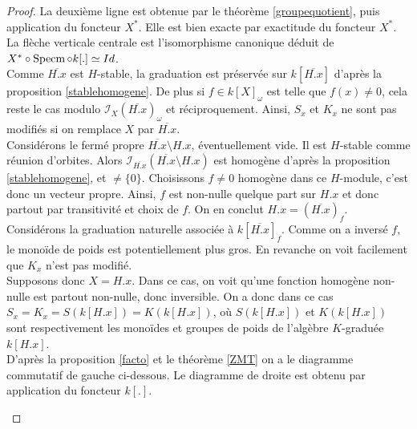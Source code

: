 \begin{proof}
La deuxième ligne est obtenue par le théorème \ref{groupequotient}, puis application du foncteur $X^*$. Elle est bien exacte par exactitude du foncteur $X^*$. La flèche verticale centrale est l'isomorphisme canonique déduit de $X^*\circ\operatorname{Specm}\circ k[.]\simeq Id$.\\ 
Comme $\overline{H.x}$ est $H$-stable, la graduation est préservée sur $k[\overline{H.x}]$ d'après la proposition \ref{stablehomogene}. De plus si $f\in k[X]_{\omega}$ est telle que $f(x)\neq 0$, cela reste le cas modulo $\mathcal{I}_{X}(\overline{H.x})_\omega$ et réciproquement. Ainsi, $S_x$ et $K_x$ ne sont pas modifiés si on remplace $X$ par $\overline{H.x}$. \\
Considérons le fermé propre $\overline{H.x}\setminus H.x$, éventuellement vide. Il est $H$-stable comme réunion d'orbites. Alors $\mathcal{I}_{\overline{H.x}}(\overline{H.x}\setminus H.x)$ est homogène d'après la proposition \ref{stablehomogene}, et $\neq \lbrace 0\rbrace$. Choisissons $f\neq0$ homogène dans ce $H$-module, c'est donc un vecteur propre. Ainsi, $f$ est non-nulle quelque part sur $H.x$ et donc partout par transitivité et choix de $f$. On en conclut $H.x=(\overline{H.x})_f$. Considérons la graduation naturelle associée à $k[\overline{H.x}]_f$. Comme on a inversé $f$, le monoïde de poids est potentiellement plus gros. En revanche on voit facilement que $K_x$ n'est pas modifié.\\
Supposons donc $X=H.x$. Dans ce cas, on voit qu'une fonction homogène non-nulle est partout non-nulle, donc inversible. On a donc dans ce cas $S_x=K_x=S(k[H.x])=K(k[H.x])$, où $S(k[H.x])$ et $K(k[H.x])$ sont respectivement les monoïdes et groupes de poids de l'algèbre $K$-graduée $k[H.x]$. \\
D'après la proposition \ref{facto} et le théorème \ref{ZMT} on a le diagramme commutatif de gauche ci-dessous. Le diagramme de droite est obtenu par application du foncteur $k[.]$.
\begin{multicols}{2}
	\begin{center}
	\end{center}


\end{multicols}
\end{proof}
